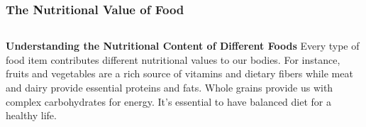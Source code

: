 \documentclass[5pt]{beamer}
\begin{document}
\begin{frame}
\frametitle{The Nutritional Value of Food}
\begin{columns}
\begin{column}{0.7\textwidth}
\begin{block}{\textbf{Understanding the Nutritional Content of Different Foods}}
Every type of food item contributes different nutritional values to our bodies. For instance, fruits and vegetables are a rich source of vitamins and dietary fibers while meat and dairy provide essential proteins and fats. Whole grains provide us with complex carbohydrates for energy. It's essential to have balanced diet for a healthy life.
\end{block}
\end{column}
\end{columns}
\end{frame}
\end{document}
